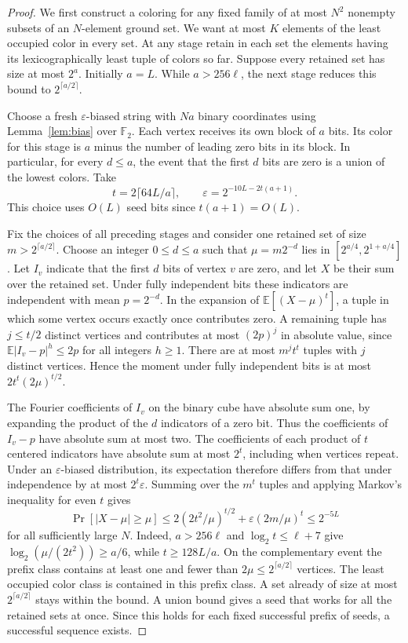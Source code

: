 \documentclass[11pt]{article}
\begin{document}
\begin{proof}
We first construct a coloring for any fixed family of at most $N^2$
nonempty subsets of an $N$-element ground set. We want at most $K$
elements of the least occupied color in every set. At any stage retain
in each set the elements having its lexicographically least tuple of
colors so far. Suppose every retained set has size at most $2^a$.
Initially $a=L$. While $a>256\ell$, the next stage reduces this bound to
$2^{\lceil a/2\rceil}$.

Choose a fresh $\varepsilon$-biased string with $Na$ binary coordinates
using Lemma~\ref{lem:bias} over $\mathbb F_2$. Each vertex receives its
own block of $a$ bits. Its color for this stage is $a$ minus the number
of leading zero bits in its block. In particular, for every $d\le a$,
the event that the first $d$ bits are zero is a union of the lowest
colors. Take
\[
 t=2\lceil 64L/a\rceil,\qquad
 \varepsilon=2^{-10L-2t(a+1)}.
\]
This choice uses $O(L)$ seed bits since $t(a+1)=O(L)$.

Fix the choices of all preceding stages and consider one retained set
of size $m>2^{\lceil a/2\rceil}$. Choose an integer $0\le d\le a$ such
that $\mu=m2^{-d}$ lies in $[2^{a/4},2^{1+a/4}]$. Let $I_v$ indicate
that the first $d$ bits of vertex $v$ are zero, and let $X$ be their sum
over the retained set. Under fully independent bits these indicators
are independent with mean $p=2^{-d}$. In the expansion of
$\mathbb E[(X-\mu)^t]$, a tuple in which some vertex occurs exactly
once contributes zero. A remaining tuple has $j\le t/2$ distinct
vertices and contributes at most $(2p)^j$ in absolute value, since
$\mathbb E|I_v-p|^h\le 2p$ for all integers $h\ge 1$. There are at
most $m^j t^t$ tuples with $j$ distinct vertices. Hence the moment
under fully independent bits is at most
$2t^t(2\mu)^{t/2}$.

The Fourier coefficients of $I_v$ on the binary cube have absolute
sum one, by expanding the product of the $d$ indicators of a zero bit.
Thus the coefficients of $I_v-p$ have absolute sum at most two.
The coefficients of each product of $t$ centered indicators have
absolute sum at most $2^t$, including when vertices repeat. Under an
$\varepsilon$-biased distribution, its expectation therefore differs
from that under independence by at most $2^t\varepsilon$. Summing over
the $m^t$ tuples and applying Markov's inequality for even $t$ gives
\[
 \Pr[|X-\mu|\ge\mu]
 \le 2(2t^2/\mu)^{t/2}
      +\varepsilon(2m/\mu)^t
 \le 2^{-5L}
\]
for all sufficiently large $N$. Indeed, $a>256\ell$ and
$\log_2 t\le \ell+7$ give
$\log_2(\mu/(2t^2))\ge a/6$, while $t\ge128L/a$.
On the complementary event the prefix class contains at least one and
fewer than $2\mu\le 2^{\lceil a/2\rceil}$ vertices. The least occupied
color class is contained in this prefix class. A set already of size at
most $2^{\lceil a/2\rceil}$ stays within the bound. A union bound gives
a seed that works for all the retained sets at once. Since this holds
for each fixed successful prefix of seeds, a successful sequence exists.


\end{proof}
\end{document}
